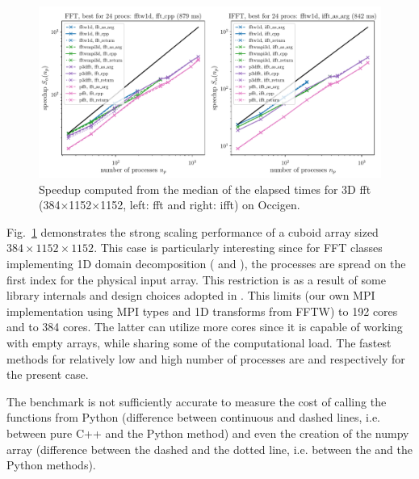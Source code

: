 \documentclass{../jors}
\begin{document}
\begin{figure}[htp!]
\centering
\includegraphics[width=\linewidth]{tmp/fig_occigen_384x1152x1152}
\caption{Speedup computed from the median of the elapsed times for 3D fft
(384$\times$1152$\times$1152, left: fft and right: ifft) on Occigen.}%
\label{fig:occigen384x1152x1152}
\end{figure}

Fig.~\ref{fig:occigen384x1152x1152} demonstrates the strong scaling performance
of a cuboid array sized $384\times1152\times1152$. This case is particularly
interesting since for FFT classes implementing 1D domain decomposition
( and ), the processes are spread on
the first index for the physical input array. This restriction is as a result
of some  library internals and design choices adopted in
. This limits  (our own MPI implementation
using MPI types and 1D transforms from FFTW) to 192 cores and
 to 384 cores. The latter can utilize more cores since it
is capable of working with empty arrays, while sharing some of the
computational load.
%
The fastest methods for relatively
low and high number of processes are  and
 respectively for the present case.

The benchmark is not sufficiently accurate to measure the cost of calling the
functions from Python (difference between continuous and dashed lines,
i.e. between pure C++ and the  Python method) and even the
creation of the numpy array (difference between the dashed and the dotted line,
i.e. between the  and the  Python
methods).
\end{document}
